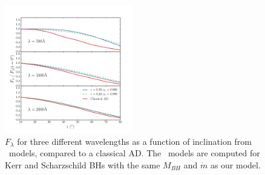 \documentclass[preprint, a4paper, 11pt]{aastex}
\begin{document}





\begin{figure}
\centering
\includegraphics[width=0.5\textwidth]{figures/agnspec.png}
\caption
{
$F_\lambda$ for three different wavelengths
as a function of inclination from \agn\ models, 
compared to a classical AD. 
The \agn\ models are computed for Kerr and Scharzschild
BHs with the same $M_{BH}$ and $\dot{m}$ as our model.
}
\label{fig:f2000}
\end{figure}

\end{document}
